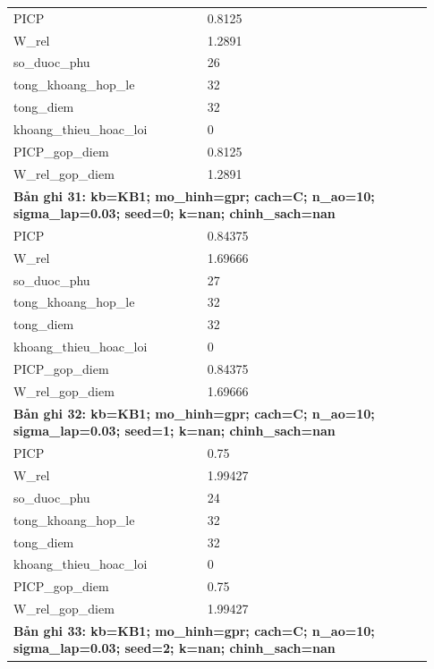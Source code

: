 \begin{longtable}{p{0.43\linewidth}p{0.50\linewidth}}
PICP & 0.8125 \\
W\_\allowbreak rel & 1.2891 \\
so\_\allowbreak duoc\_\allowbreak phu & 26 \\
tong\_\allowbreak khoang\_\allowbreak hop\_\allowbreak le & 32 \\
tong\_\allowbreak diem & 32 \\
khoang\_\allowbreak thieu\_\allowbreak hoac\_\allowbreak loi & 0 \\
PICP\_\allowbreak gop\_\allowbreak diem & 0.8125 \\
W\_\allowbreak rel\_\allowbreak gop\_\allowbreak diem & 1.2891 \\
\midrule
\multicolumn{2}{p{0.95\linewidth}}{\textbf{Bản ghi 31: kb=KB1; mo\_hinh=gpr; cach=C; n\_ao=10; sigma\_lap=0.03; seed=0; k=nan; chinh\_sach=nan}} \\
PICP & 0.84375 \\
W\_\allowbreak rel & 1.69666 \\
so\_\allowbreak duoc\_\allowbreak phu & 27 \\
tong\_\allowbreak khoang\_\allowbreak hop\_\allowbreak le & 32 \\
tong\_\allowbreak diem & 32 \\
khoang\_\allowbreak thieu\_\allowbreak hoac\_\allowbreak loi & 0 \\
PICP\_\allowbreak gop\_\allowbreak diem & 0.84375 \\
W\_\allowbreak rel\_\allowbreak gop\_\allowbreak diem & 1.69666 \\
\midrule
\multicolumn{2}{p{0.95\linewidth}}{\textbf{Bản ghi 32: kb=KB1; mo\_hinh=gpr; cach=C; n\_ao=10; sigma\_lap=0.03; seed=1; k=nan; chinh\_sach=nan}} \\
PICP & 0.75 \\
W\_\allowbreak rel & 1.99427 \\
so\_\allowbreak duoc\_\allowbreak phu & 24 \\
tong\_\allowbreak khoang\_\allowbreak hop\_\allowbreak le & 32 \\
tong\_\allowbreak diem & 32 \\
khoang\_\allowbreak thieu\_\allowbreak hoac\_\allowbreak loi & 0 \\
PICP\_\allowbreak gop\_\allowbreak diem & 0.75 \\
W\_\allowbreak rel\_\allowbreak gop\_\allowbreak diem & 1.99427 \\
\midrule
\multicolumn{2}{p{0.95\linewidth}}{\textbf{Bản ghi 33: kb=KB1; mo\_hinh=gpr; cach=C; n\_ao=10; sigma\_lap=0.03; seed=2; k=nan; chinh\_sach=nan}} \\

\end{longtable}

